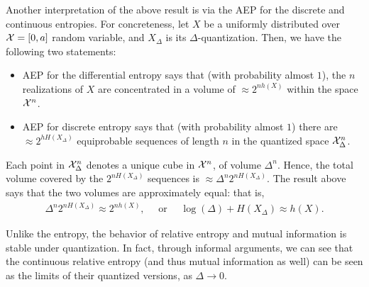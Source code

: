             \begin{remark}
                \label{remark:quantized-entropy-2} Another interpretation of the above result is via the AEP for the discrete and continuous entropies. For concreteness, let $X$ be a uniformly distributed over $\mathcal{X}=[0,a]$ random variable, and $X_\Delta$ is its $\Delta$-quantization. Then, we have the following two statements: 
                \begin{itemize}
                    \item AEP for the differential entropy says that (with probability almost $1$), the $n$ \iid realizations of $X$ are concentrated in a volume of $\approx 2^{n h(X)}$ within the space $\mathcal{X}^n$. 
                    \item AEP for discrete entropy says that (with probability almost $1$) there are $\approx 2^{h H(X_\Delta)}$ equiprobable sequences of length $n$ in the quantized space $\mathcal{X}_\Delta^n$. 
                \end{itemize}
                Each point in $\mathcal{X}_\Delta^n$ denotes  a unique cube in $\mathcal{X}^n$, of volume $\Delta^n$. Hence, the total volume covered by the $2^{n H(X_\Delta)}$ sequences is $\approx \Delta^n 2^{n H(X_\Delta)}$. The result above says that the two volumes are approximately equal: that is, 
                \begin{align}
                    \Delta^n 2^{n H(X_\Delta)} \approx 2^{n h(X)}, \quad \text{ or } \quad  \log (\Delta) + H(X_\Delta) \approx h(X). 
                \end{align}
            \end{remark}

            Unlike the entropy, the behavior of relative entropy and mutual information is stable under quantization. In fact, through informal arguments, we can see that the continuous relative entropy (and thus mutual information as well) can be seen as the limits of their quantized versions, as $\Delta \to 0$. 

